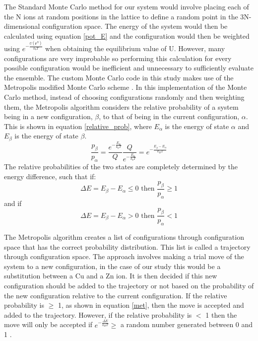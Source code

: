 The Standard Monte Carlo method for our system would involve placing each of the N ions at random positions in the lattice to define a random point in the 3N-dimensional configuration space. The energy of the system would then be calculated using equation \ref{pot_E} and the configuration would then be weighted using $e^{-\frac{U(\mathbf{r}^N)}{k_bT}}$ when obtaining the equilibrium value of U. However, many configurations are very improbable so performing this calculation for every possible configuration would be inefficient and unnecessary to sufficiently evaluate the ensemble. The custom Monte Carlo code in this study makes use of the Metropolis modified Monte Carlo scheme \cite{Metropolis}. In this implementation of the Monte Carlo method, instead of choosing configurations randomly and then weighting them, the Metropolis algorithm considers the relative probability of a system being in a new configuration, $\beta$, to that of being in the current configuration, $\alpha$. This is shown in equation \ref{relative_prob}, where $E_\alpha$ is the energy of state $\alpha$ and $E_\beta$ is the energy of state $\beta$.
\begin{equation}\label{relative_prob}
\frac{p_\beta}{p_\alpha} = \frac{  e^{-\frac{E_\alpha}{k_bT}} }{Q} \frac{Q}{  e^{-\frac{E_\alpha}{k_bT}} } = e^{- \frac{E_\beta - E_\alpha}{k_BT}}
\end{equation}
The relative probabilities of the two states are completely determined by the energy 
difference, such that if:
\begin{equation}\label{met}
\Delta E = E_{\beta} - E_{\alpha} \leq 0 \text{   then   } \frac{p_{\beta}}{p_{\alpha}} \geq 1 
\end{equation}
and if
\begin{equation}\label{met2}
\Delta E = E_{\beta} - E_{\alpha} > 0 \text{   then   } \frac{p_{\beta}}{p_{\alpha}} < 1
\end{equation}

The Metropolis algorithm creates a list of configurations through configuration space that has the correct probability distribution. This list is called a trajectory through configuration space. The approach involves making a trial move of the system to a new configuration, in the case of our study this would be a substitution between a Cu and a Zn ion. It is then decided if this new configuration should be added to the trajectory or not based on the probability of the new configuration relative to the current configuration. If the relative probability is  $\geq$ 1, as shown in equation \ref{met}, then the move is accepted and added to the trajectory. However, if the relative probability is $<$ 1 then the move will only be accepted if $e^{-\frac{\Delta E}{k_BT}} \ge$ a random number generated between 0 and 1 \cite{Lesar3}.


